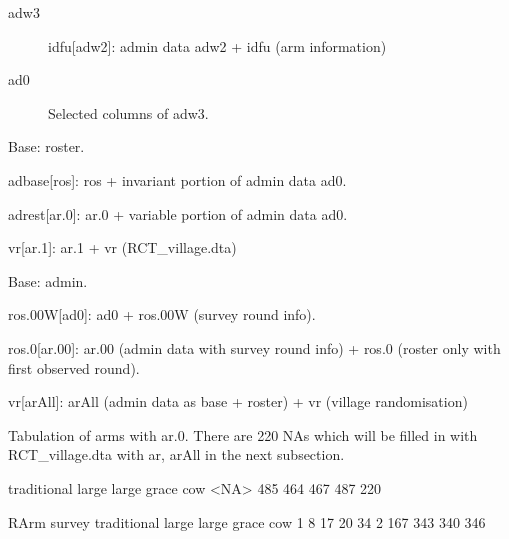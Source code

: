 \begin{description}
\vspace{1.0ex}\setlength{\itemsep}{1.0ex}\setlength{\baselineskip}{12pt}
\item[adw3]	idfu[adw2]: admin data \textsf{adw2} + \textsf{idfu} (arm information)
\item[ad0]	Selected columns of adw3.
\end{description}
Base: roster.
\begin{description}
\vspace{1.0ex}\setlength{\itemsep}{1.0ex}\setlength{\baselineskip}{12pt}
\item[ar.0]	adbase[ros]: \textsf{ros} + invariant portion of admin data \textsf{ad0}.
\item[ar.1]	adrest[ar.0]: \textsf{ar.0} + variable portion of admin data \textsf{ad0}.
\item[ar] vr[ar.1]: \textsf{ar.1} + \textsf{vr} (RCT\_village.dta)
\end{description}
Base: admin.
\begin{description}
\vspace{1.0ex}\setlength{\itemsep}{1.0ex}\setlength{\baselineskip}{12pt}
\item[ar.00]	ros.00W[ad0]: \textsf{ad0} + \textsf{ros.00W} (survey round info).
\item[arAll]	ros.0[ar.00]: \textsf{ar.00} (admin data with survey round info) + \textsf{ros.0} (roster only with first observed round).
\item[arA] vr[arAll]: \textsf{arAll} (admin data as base + roster) + \textsf{vr} (village randomisation)
\end{description}

Tabulation of arms with \textsf{ar.0}. There are 220 NAs which will be filled in with \textsf{RCT\_village.dta} with \textsf{ar, arAll} in the next subsection.
\begin{Schunk}
\begin{Soutput}

traditional       large large grace         cow        <NA> 
        485         464         467         487         220 
\end{Soutput}
\end{Schunk}



\begin{Schunk}
\begin{Soutput}
      RArm
survey traditional large large grace cow
     1           8    17          20  34
     2         167   343         340 346
\end{Soutput}
\end{Schunk}

